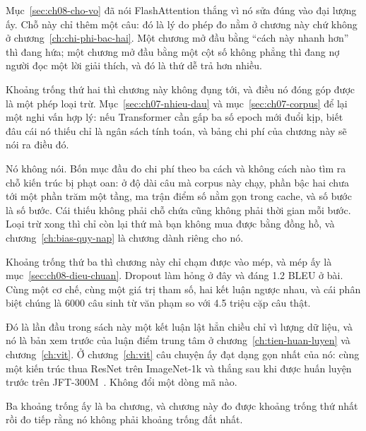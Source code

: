 Mục~\ref{sec:ch08-cho-vo} đã nói FlashAttention thắng vì nó sửa đúng vào đại
lượng ấy. Chỗ này chỉ thêm một câu: đó là lý do phép đo nằm ở chương này chứ
không ở chương~\ref{ch:chi-phi-bac-hai}. Một chương mở đầu bằng \enquote{cách
này nhanh hơn} thì đang hứa; một chương mở đầu bằng một cột số không phẳng thì
đang nợ người đọc một lời giải thích, và đó là thứ dễ trả hơn nhiều.

%
Khoảng trống thứ hai thì chương này không đụng tới, và điều nó đóng góp được là
một phép loại trừ. Mục~\ref{sec:ch07-nhieu-dau} và mục~\ref{sec:ch07-corpus} để
lại một nghi vấn hợp lý: nếu Transformer cần gấp ba số epoch mới đuổi kịp, biết
đâu cái nó thiếu chỉ là ngân sách tính toán, và bảng chi phí của chương này sẽ
nói ra điều đó.

Nó không nói. Bốn mục đầu đo chi phí theo ba cách và không cách nào tìm ra chỗ
kiến trúc bị phạt oan: ở độ dài câu mà corpus này chạy, phần bậc hai chưa tới
một phần trăm một tầng, ma trận điểm số nằm gọn trong cache, và số bước là số
bước. Cái thiếu không phải chỗ chứa cũng không phải thời gian mỗi bước. Loại trừ
xong thì chỉ còn lại thứ mà bạn không mua được bằng đồng hồ, và
chương~\ref{ch:bias-quy-nap} là chương dành riêng cho nó.

%
Khoảng trống thứ ba thì chương này chỉ chạm được vào mép, và mép ấy là
mục~\ref{sec:ch08-dieu-chuan}. Dropout làm hỏng ở đây và đáng 1.2 BLEU ở bài.
Cùng một cơ chế, cùng một giá trị tham số, hai kết luận ngược nhau, và cái phân
biệt chúng là 6000 câu sinh từ văn phạm so với 4.5 triệu cặp câu thật.

Đó là lần đầu trong sách này một kết luận lật hẳn chiều chỉ vì lượng dữ liệu, và
nó là bản xem trước của luận điểm trung tâm ở chương~\ref{ch:tien-huan-luyen} và
chương~\ref{ch:vit}. Ở chương~\ref{ch:vit} câu chuyện ấy đạt dạng gọn nhất của
nó: cùng một kiến trúc thua ResNet trên ImageNet-1k và thắng sau khi được huấn
luyện trước trên JFT-300M~\autocite{dosovitskiy2021vit}. Không đổi một dòng mã
nào.

Ba khoảng trống ấy là ba chương, và chương này đo được khoảng trống thứ nhất rồi
đo tiếp rằng nó không phải khoảng trống đắt nhất.
